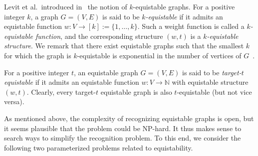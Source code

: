 \documentclass{llncs}
\begin{document}
Levit et al.~introduced in~\cite{MR3040147} the notion of $k$-equistable graphs. For a positive integer $k$, a graph $G=(V,E)$ is said to be {\em $k$-equistable} if it admits an equistable function $w: V \to [k]:=\{1,\ldots, k\}$. Such a weight function is called a {\em $k$-equistable function}, and the corresponding structure $(w,t)$ is a {\em $k$-equistable structure}. We remark that there exist equistable graphs such that the smallest $k$ for which the graph is $k$-equistable is exponential in the number of vertices of $G$~\cite{MR2823204}.

For a positive integer $t$, an equistable graph $G=(V,E)$ is said to be {\em \hbox{target-$t$} equistable} if it admits an equistable
function $w: V \to \mathbb{N}$ with equistable structure $(w,t)$.
Clearly, every target-$t$ equistable graph is also $t$-equistable (but not vice versa).

\begin{sloppypar}
As mentioned above, the complexity of recognizing equistable graphs is open, but it seems \hbox{plausible} that the problem could be NP-hard. It thus makes sense to search ways to simplify the recognition problem. To this end, we consider the following two parameterized problems related to equistability.
\end{sloppypar}

\medskip
\begin{center}
\end{center}

\smallskip

\begin{center}
\end{center}
\end{document}
